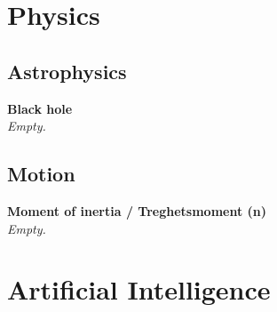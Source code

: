 \documentclass[12pt]{report}
\begin{document}
\chapter{Physics}
\section{Astrophysics}
\textbf{Black hole} \\
\textit{Empty.}

\section{Motion}
\textbf{Moment of inertia / Treghetsmoment (n)} \\
\textit{Empty.}

\chapter{Artificial Intelligence}






    





\printindex


\raggedright                    %
\sloppy
\printbibliography[heading=bibintoc,title={Bibliography}]
\end{document}
